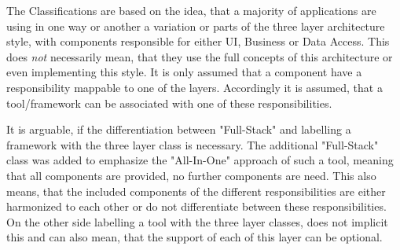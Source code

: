 The Classifications are based on the idea, that a majority of applications are using in one way or another a variation or parts of the three layer architecture style, with components responsible for either UI, Business or Data Access. This does \textit{not} necessarily mean, that they use the full concepts of this architecture or even implementing this style. It is only assumed that a component have a responsibility mappable to one of the layers. Accordingly it is assumed, that a tool/framework can be associated with one of these responsibilities.

It is arguable, if the differentiation between "Full-Stack" and labelling a framework with the three layer class is necessary. The additional "Full-Stack" class was added to emphasize the "All-In-One" approach of such a tool, meaning that all components are provided, no further components are need. This also means, that the included components of the different responsibilities are either harmonized to each other or do not differentiate between these responsibilities. On the other side labelling a tool with the three layer classes, does not implicit this and can also mean, that the support of each of this layer can be optional.